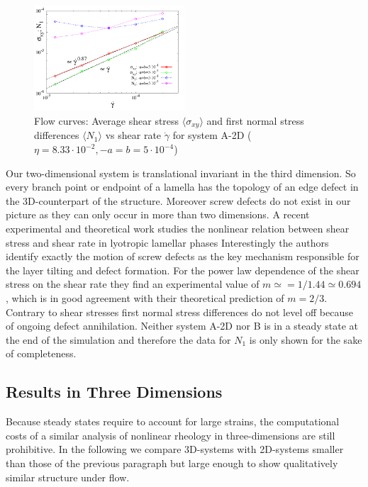 \documentclass[8.5pt,twoside,twocolumn]{article}
\begin{document}
\begin{figure}[htp!]
\centering
\includegraphics[angle=0,width=0.5\textwidth]{S_xy_N1_gammadot.pdf}
\caption{Flow curves: Average shear stress $\langle \sigma_{xy}\rangle$ and first normal stress differences $\langle N_1 \rangle$ vs shear rate $\dot{\gamma}$ for system A-2D ($\eta=8.33\cdot10^{-2}, -a=b=5\cdot 10^{-4}$)} 
\label{fig11}
\end{figure}

Our two-dimensional system is translational invariant in the third dimension.
So every branch point or endpoint of a lamella has the topology of an edge defect in the 3D-counterpart of the structure.
Moreover screw defects do not exist in our picture as they can only occur in more than two dimensions.
A recent experimental and theoretical work studies the nonlinear relation between shear stress and shear rate in lyotropic lamellar phases \cite{Lu08}
Interestingly the authors identify exactly the motion of screw defects as the key mechanism responsible for the layer tilting and defect formation. 
For the power law dependence of the shear stress on the shear rate they find an experimental value of $m\simeq=1/1.44\simeq 0.694$, which is in good agreement with their theoretical prediction of $m=2/3$.\\
Contrary to shear stresses first normal stress differences do not level off because of ongoing defect annihilation.
Neither system A-2D nor B is in a steady state at the end of the simulation and therefore the data for $N_1$ is only shown for the sake of completeness.



\subsection*{Results in Three Dimensions}

Because steady states require to account for large strains, the computational costs of a similar analysis of nonlinear rheology in three-dimensions are still prohibitive.
In the following we compare 3D-systems with 2D-systems smaller than those of the previous paragraph but large enough to show qualitatively similar structure under flow.
\end{document}
